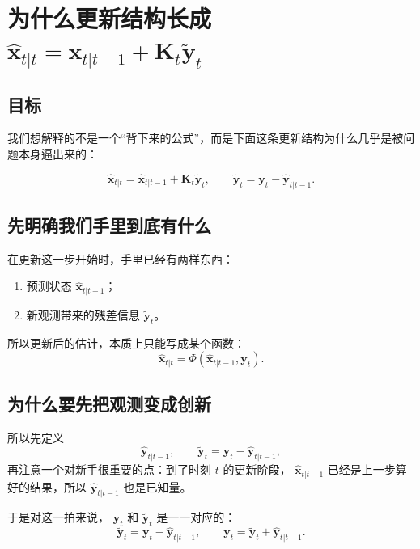 \section{为什么更新结构长成 \texorpdfstring{$\hat{\bm{x}}_{t|t}=\hat{\bm{x}}_{t|t-1}+\bm{K}_t\tilde{\bm{y}}_t$}{xhat = xhat + K ytilde}}\label{app:update-structure}

\subsection{目标}

我们想解释的不是一个“背下来的公式”，而是下面这条更新结构为什么几乎是被问题本身逼出来的：

\[
\hat{\bm{x}}_{t|t}
= \hat{\bm{x}}_{t|t-1} + \bm{K}_t\tilde{\bm{y}}_t,
\qquad
\tilde{\bm{y}}_t = \bm{y}_t - \hat{\bm{y}}_{t|t-1}.
\]

\subsection{先明确我们手里到底有什么}

在更新这一步开始时，手里已经有两样东西：

\begin{enumerate}
  \item 预测状态
  \(\hat{\bm{x}}_{t|t-1}\)；
  \item 新观测带来的残差信息
  \(\tilde{\bm{y}}_t\)。
\end{enumerate}

所以更新后的估计，本质上只能写成某个函数：
\[
\hat{\bm{x}}_{t|t} = \Phi(\hat{\bm{x}}_{t|t-1}, \bm{y}_t).
\]

\subsection{为什么要先把观测变成创新}


所以先定义
\[
\hat{\bm{y}}_{t|t-1},
\qquad
\tilde{\bm{y}}_t = \bm{y}_t - \hat{\bm{y}}_{t|t-1},
\]
再注意一个对新手很重要的点：到了时刻 \(t\) 的更新阶段，
\(\hat{\bm{x}}_{t|t-1}\)
已经是上一步算好的结果，所以
\(\hat{\bm{y}}_{t|t-1}\)
也是已知量。

于是对这一拍来说，
\(\bm{y}_t\)
和
\(\tilde{\bm{y}}_t\)
是一一对应的：
\[
\tilde{\bm{y}}_t = \bm{y}_t - \hat{\bm{y}}_{t|t-1},
\qquad
\bm{y}_t = \tilde{\bm{y}}_t + \hat{\bm{y}}_{t|t-1}.
\]


